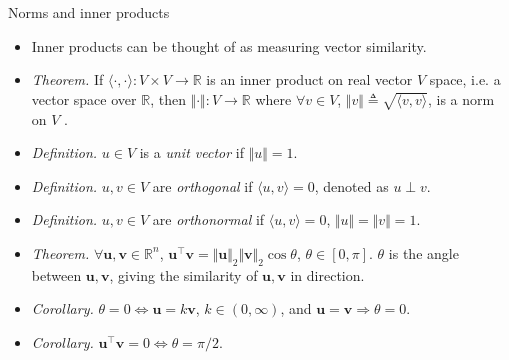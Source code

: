 \documentclass{beamer}
\numberwithin{equation}{section}
\begin{document}
\begin{frame}{Norms and inner products}
    \begin{itemize}
        \item
        Inner products can be thought of as measuring vector similarity.

        \item
        \textit{Theorem.} If $ \langle\cdot, \cdot\rangle : V \times V
        \rightarrow \mathbb{R} $ is an inner product on real vector $ V $
        space, i.e. a vector space over $ \mathbb{R} $, then
        $ \Vert\cdot\Vert : V \rightarrow \mathbb{R} $ where
        $ \forall v \in V $, $ \Vert v\Vert \triangleq
        \sqrt{\langle v, v\rangle} $, is a norm on $ V $ \cite{jacob_linalg}.

        \item
        \textit{Definition.} $ u \in V $ is a \textit{unit vector} if
        $ \Vert u\Vert = 1 $.        

        \item
	    \textit{Definition.} $ u, v \in V $ are \textit{orthogonal} if 
	    $ \langle u, v\rangle = 0 $, denoted as $ u \perp v $.

        \item
        \textit{Definition.} $ u, v \in V $ are \textit{orthonormal} if
        $ \langle u, v\rangle = 0 $, $ \Vert u\Vert = \Vert v\Vert = 1 $.

        \item
        \textit{Theorem.} $ \forall \mathbf{u}, \mathbf{v} \in \mathbb{R}^n $,
        $ \mathbf{u}^\top\mathbf{v} = \Vert\mathbf{u}\Vert_2
        \Vert\mathbf{v}\Vert_2\cos\theta $, $ \theta \in [0, \pi] $.
        $ \theta $ is the angle between $ \mathbf{u}, \mathbf{v} $, giving the
        similarity of $ \mathbf{u}, \mathbf{v} $ in direction.

        \item
        \textit{Corollary.} $ \theta = 0 \Leftrightarrow
        \mathbf{u} = k\mathbf{v} $, $ k \in (0, \infty) $, and $ \mathbf{u} =
        \mathbf{v} \Rightarrow \theta = 0 $.

        \item
        \textit{Corollary.} $ \mathbf{u}^\top\mathbf{v} = 0 \Leftrightarrow
        \theta = \pi / 2 $.
    \end{itemize}
\end{frame}
\end{document}

